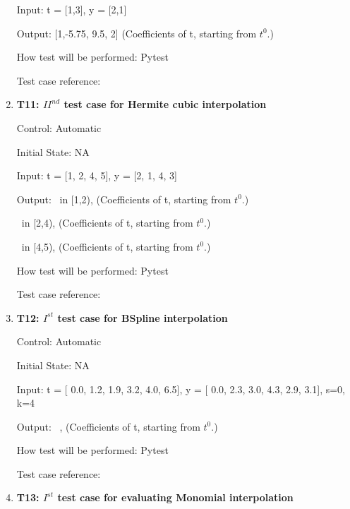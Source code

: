 \documentclass[12pt, titlepage]{article}
\begin{document}
\begin{enumerate}
Input: t = [1,3], y = [2,1]

Output: [1,-5.75, 9.5, 2] (Coefficients of t, starting from $t^{0}$.)


How test will be performed: Pytest

Test case reference: \cite{HermiteCubic} \\

\item{\textbf{T11: ${II}^{nd}$ test case for Hermite  
cubic 
interpolation} \\}

Control: Automatic 

Initial State: NA

Input: t = [1, 2, 4, 5], y = [2, 1, 4, 3]

Output: 
~\newline [1.0,1.0, 1.38888889, 2.0] in [1,2), (Coefficients of t, starting from $t^{0}$.)

~\newline [4.0, 4.0, 1.0, 1.0] in [2,4), (Coefficients of t, starting from $t^{0}$.)

~\newline[3.0, 3.61111111, 4.0, 4.0] in [4,5), (Coefficients of t, starting from $t^{0}$.)

How test will be performed: Pytest

Test case reference: \cite{HermiteCubic2}\\

\item{\textbf{T12: $I^{st}$ test case for BSpline interpolation} \\}

Control: Automatic 

Initial State: NA

Input: t = [ 0.0, 1.2,  1.9,  3.2,  4.0,  6.5], y = [ 0.0,  2.3,  3.0,  4.3,  2.9,  3.1], s=0, k=4


Output: 
~\newline [-5.62048630e-18, 2.98780300e+00, -5.74472095e-01,  1.46700914e+01,
-1.03253068e+01,  3.10000000e+00,  0.00000000e+00,  0.00000000e+00,
0.00000000e+00,  0.00000000e+00,  0.00000000e+00], (Coefficients of t, starting from $t^{0}$.)

How test will be performed: Pytest

Test case reference: \cite{BSpline}



\item{\textbf{T13: $I^{st}$ test case for evaluating Monomial interpolation}}


\end{enumerate}
\end{document}
